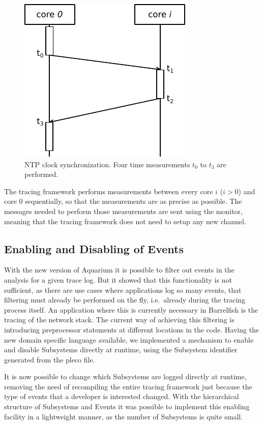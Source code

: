 \documentclass[a4paper,11pt,twoside]{report}
\begin{document}
\begin{figure}[t]
	\begin{center}
		\includegraphics{images/ntp.pdf}
	\end{center}
	\caption{NTP clock synchronization. Four time measurements $t_0$ to $t_3$
	are performed. }
	\label{fig:ntp}
\end{figure}

The tracing framework performs measurements between every core $i$ ($i > 0$) and
core $0$ sequentially, so that the measurements are as precise as possible. The
messages needed to perform those measurements are sent using the monitor,
meaning that the tracing framework does not need to setup any new channel.

\subsection{Enabling and Disabling of Events\label{sec:enabling-disabling}}

With the new version of Aquarium it is possible to filter out events in the
analysis for a given trace log. But it showed that this functionality is not
sufficient, as there are use cases where applications log so many events, that
filtering must already be performed on the fly, i.e.~already during the tracing
process itself. An application where this is currently necessary in Barrelfish
is the tracing of the network stack. The current way of achieving this filtering
is introducing preprocessor statements at different locations in the code.
Having the new domain specific language available, we implemented a mechanism to
enable and disable Subsystems directly at runtime, using the Subsystem
identifier generated from the pleco file.

It is now possible to change which Subsystems are logged directly at runtime,
removing the need of recompiling the entire tracing framework just because the
type of events that a developer is interested changed. With the hierarchical
structure of Subsystems and Events it was possible to implement this enabling
facility in a lightweight manner, as the number of Subsystems is quite small.
\end{document}
